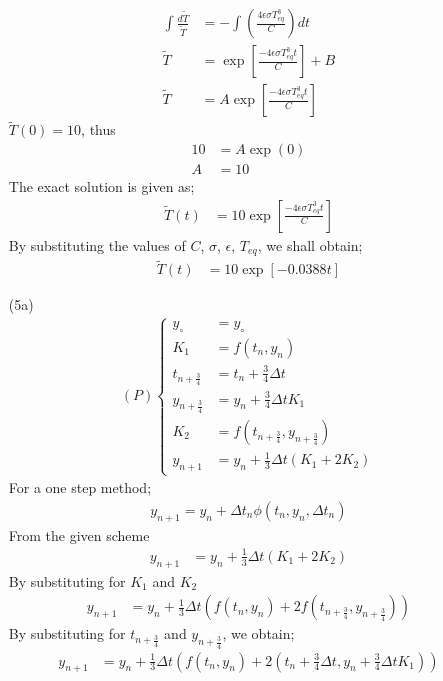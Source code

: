 \documentclass[12pt,a4paper]{article}
\begin{document}
\begin{itemize}
\begin{align*}
	\int \frac{d\tilde{T}}{\tilde{T}}&=-\int \left(\frac{4\epsilon\sigma T^{3}_{eq}}{C}\right)dt\\
	\tilde{T}&=\exp\left[\frac{-4\epsilon\sigma T^{3}_{eq}t}{C}\right]+ B\\
	\tilde{T}&=A\exp\left[\frac{-4\epsilon\sigma T^{3}_{eq}t}{C}\right]
	\end{align*}
	$\tilde{T}(0)=10$, thus
	\begin{align*}
	10&=A\exp(0)\\
	A&=10
	\end{align*}
	The exact solution is given as;
	\begin{align*}
	\tilde{T}(t)&=10\exp\left[\frac{-4\epsilon\sigma T^{3}_{eq}t}{C}\right]
	\end{align*}
	By substituting the values of $C$, $\sigma$, $\epsilon$, $T_{eq}$, we shall obtain;
	\begin{align*}
		\tilde{T}(t)&=10\exp[-0.0388t]
	\end{align*}
	\item [(5a)] 
	\begin{align*}
	(P)
	\begin{cases}
	y_{\circ}&=y_{\circ}\\
	K_{1}&=f(t_{n},y_{n})\\
	t_{n+\frac{3}{4}}&=t_{n}+\frac{3}{4} \Delta t\\
	y_{n+\frac{3}{4}}&=y_{n}+\frac{3}{4} \Delta t K_{1}\\
	K_{2}&=f(t_{n+\frac{3}{4}},y_{n+\frac{3}{4}})\\
	y_{n+1}&=y_{n}+\frac{1}{3}\Delta t (K_{1}+2K_{2})
	\end{cases}
	\end{align*}
	For a one step method;
	\begin{align}
	y_{n+1}=y_{n}+\Delta t_{n}\phi(t_{n},y_{n},\Delta t_{n}) \label{7}
	\end{align}
	From the given scheme
	\begin{align*}
	y_{n+1}&=y_{n}+\frac{1}{3}\Delta t (K_{1}+2K_{2})
	\end{align*}
	By substituting for $K_{1}$ and $K_{2}$
	\begin{align*}
		y_{n+1}&=y_{n}+\frac{1}{3}\Delta t \left(f(t_{n},y_{n})+ 2f(t_{n+\frac{3}{4}},y_{n+\frac{3}{4}}) \right)
	\end{align*}
	By substituting for $t_{n+\frac{3}{4}}$ and $y_{n+\frac{3}{4}}$, we obtain;
	\begin{align*}
	y_{n+1}&=y_{n}+ \frac{1}{3}\Delta t\left(f(t_{n},y_{n})+2\left(t_{n}+\frac{3}{4} \Delta t,y_{n}+\frac{3}{4} \Delta t K_{1}\right)\right)

\end{align*}
\end{itemize}
\end{document}
